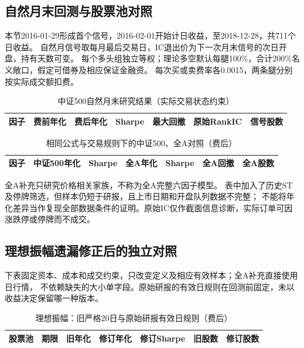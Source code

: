 \documentclass[UTF8,zihao=-4,fontset=fandol]{ctexart}
\begin{document}
\subsection{自然月末回测与股票池对照}
本节2016-01-29形成首个信号，2016-02-01开始计日收益，至2018-12-28，共711个日收益。
自然月信号取每月最后交易日，IC退出价为下一次月末信号的次日开盘，持有天数可变。
每个多头组独立等权；理论多空默认每腿100\%，合计200\%名义敞口，假定可借券及相应保证金融资。
每次买或卖费率各0.0015，两条腿分别按实际成交额扣费。

\begin{table}[H]\centering\small
\caption{中证500自然月末研究结果（实际交易状态约束）}
\setlength{\tabcolsep}{4pt}
\begin{tabular}{lrrrrrr}\toprule
因子 & 费前年化 & 费后年化 & Sharpe & 最大回撤 & 原始RankIC & 信号股数\\\midrule
\bottomrule
\end{tabular}\end{table}

\begin{table}[H]\centering\small
\caption{相同公式与交易规则下的中证500、全A对照（费后）}
\setlength{\tabcolsep}{4pt}
\begin{tabular}{lrrrrrr}\toprule
因子 & 中证500年化 & Sharpe & 全A年化 & Sharpe & 全A回撤 & 全A股数\\\midrule
\bottomrule
\end{tabular}\end{table}
全A补充只研究价格相关家族，不称为全A完整六因子模型。
表中加入了历史ST及停牌筛选，但样本仍短于研报，且上市日期和开盘队列数据不完整；
不能将年化差异当作复现全部数据条件的证明。原始IC仅作截面信息诊断，实际订单可因涨跌停或停牌而不成交。

\clearpage
\subsection{理想振幅遗漏修正后的独立对照}
下表固定资本、成本和成交约束，只改变定义及相应有效样本；全A补充直接使用日行情，
不依赖缺失的大小单字段。原始研报的有效日规则在回测前固定，未以收益决定保留哪一种版本。
\begin{table}[H]\centering\small
\caption{理想振幅：旧严格20日与原始研报有效日规则（费后）}
\setlength{\tabcolsep}{4pt}
\begin{tabular}{llrrrrr}\toprule
股票池 & 期限 & 旧年化 & 修订年化 & 修订Sharpe & 旧股数 & 修订股数\\\midrule
\bottomrule
\end{tabular}\end{table}
\end{document}
